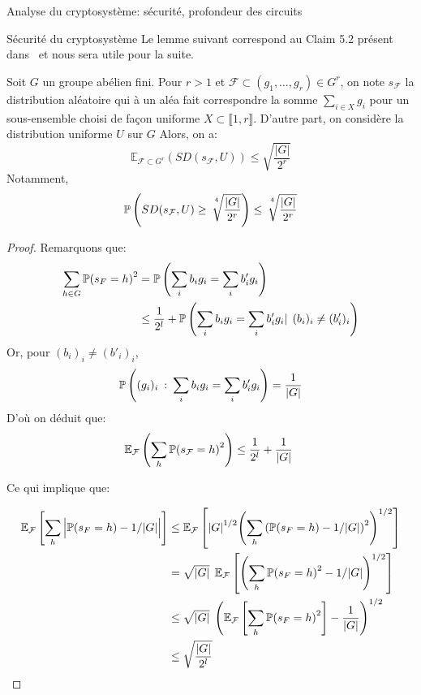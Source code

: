 \begin{section}{Analyse du cryptosystème: sécurité, profondeur des circuits}
\begin{subsection}{Sécurité du cryptosystème}
	Le lemme suivant correspond au Claim 5.2 présent dans~\cite{STOC:Regev05}
	et nous sera utile pour la suite.

	\begin{lemme}
	Soit $G$ un groupe abélien fini. Pour $r > 1$ et 
	$\mathcal{F} \subset (g_1, \ldots, g_r) \in G^r$, on
	note
	 $s_\mathcal{F}$ la distribution aléatoire qui à un aléa
	 fait correspondre la somme $\sum_{i\in X} g_i$ pour un
	 sous-ensemble choisi de façon uniforme  $X\subset \llbracket
	 1, r \rrbracket$. 
	 D'autre part, on considère la distribution uniforme
	 $U$ sur $G$
	 Alors, on a: 
	 \[\mathbb{E}_{\mathcal{F}\subset G^r}(SD(s_\mathcal{F},U)) \leq 
	   \sqrt{\frac{|G|}{2^r}}\]
	 Notamment, 
	 \[\mathbb{P}\left(SD(s_\mathcal{F},U) \geq
		 \sqrt[\leftroot{-3}\uproot{8}4\:]{\frac{|G|}{2^r}} \right) \leq
		 \sqrt[\leftroot{-3}\uproot{8}4\:]{\frac{|G|}{2^r}}
	 \]
	\end{lemme}
	\begin{proof}
		Remarquons que:
	\begin{align*}
		\sum_{h\in G} {\mathbb{P}(s_F = h)}^2 &= 
		\mathbb{P}\left(\sum_i b_i g_i = \sum_i b'_i g_i\right) \\
		& \leq \frac{1}{2^l} + \mathbb{P}
		\left( \sum_i b_i g_i = \sum_i b'_i g_i |\:\: (b_i)_i \neq
		(b'_i)_i \right)
	\end{align*}
	Or, pour $(b_i)_i \neq (b'_i)_i$, 
		\[ \mathbb{P}\left((g_i)_i\: :\: \sum_i b_i g_i = \sum_i b'_i
		g_i\right) = \frac{1}{|G|}\]
	D'où on déduit que:
	\[\mathbb{E}_\mathcal{F}\left(\sum_h {\PP(s_{\mathcal{F}} =
	h)}^2\right) \leq \frac{1}{2^l} + \frac{1}{|G|} \]

	Ce qui implique que:

\begin{align*}
\mathbb{E}_\mathcal{F}\left[ \sum_h\Big| \mathbb{P}(s_F = h) - 1/|G|\Big| \right] 
&\leq
\mathbb{E}_\mathcal{F}
\left[ 
	{|G|}^{1/2}
	{ \left( \sum_h {\left(\mathbb{P}(s_F = h) - 1/|G|\right)}^2
	\right)}^{1/2}
\right] 
\\
&= \sqrt{|G|} \:\:
\mathbb{E}_\mathcal{F}
	\left[ 
	{\left( \sum_h {\mathbb{P}(s_F = h)}^2 - 1/|G|\right)}^{1/2} 
	\right] \\
&\leq \sqrt{|G|} \:\:
{\left( 
	\mathbb{E}_\mathcal{F}\left[ \sum_h  {\mathbb{P}(s_F = h)}^2  \right]
- \frac{1}{|G|}
\right)}^{1/2} \\
	&\leq \sqrt{\frac{|G|}{2^l}}
\end{align*}

\end{proof}


\end{subsection}
\end{section}
